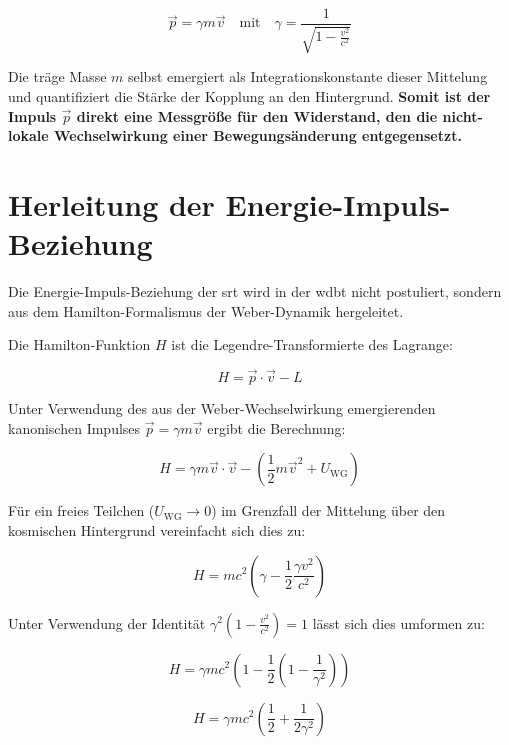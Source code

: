 \begin{equation}
    \vec{p} = \gamma m \vec{v} \quad \text{mit} \quad \gamma = \frac{1}{\sqrt{1 - \frac{v^2}{c^2}}}
\end{equation}

Die träge Masse $m$ selbst emergiert als Integrationskonstante dieser Mittelung und quantifiziert die Stärke der Kopplung an den Hintergrund. \textbf{Somit ist der Impuls $\vec{p}$ direkt eine Messgröße für den
Widerstand, den die nicht-lokale Wechselwirkung einer Bewegungsänderung entgegensetzt.}

\section{Herleitung der Energie-Impuls-Beziehung}
Die Energie-Impuls-Beziehung der \gls{srt} wird in der \gls{wdbt} nicht postuliert, sondern aus dem Hamilton-Formalismus der Weber-Dynamik hergeleitet.

Die Hamilton-Funktion $H$ ist die Legendre-Transformierte des Lagrange:

\begin{equation}
    H = \vec{p} \cdot \vec{v} - L
\end{equation}

Unter Verwendung des aus der Weber-Wechselwirkung emergierenden kanonischen Impulses $\vec{p} = \gamma m \vec{v}$ ergibt die Berechnung:

\begin{equation}
    H = \gamma m \vec{v} \cdot \vec{v} - \left( \frac{1}{2}m\vec{v}^2 + U_{\mathrm{WG}} \right)
\end{equation}

Für ein freies Teilchen ($U_\text{WG} \to 0$) im Grenzfall der Mittelung über den kosmischen Hintergrund vereinfacht sich dies zu:

\begin{equation}
    H = m c^2 \left( \gamma - \frac{1}{2} \frac{\gamma v^2}{c^2} \right)
\end{equation}

Unter Verwendung der Identität $\gamma^2 \left(1 -  \frac{v^2}{c^2}\right) = 1$ lässt sich dies umformen zu:

\begin{equation}
    H = \gamma m c^2 \left( 1 - \frac{1}{2} \left(1 - \frac{1}{\gamma^2}\right) \right)
\end{equation}

\begin{equation}
    H = \gamma m c^2 \left( \frac{1}{2} + \frac{1}{2\gamma^2} \right)
\end{equation}

